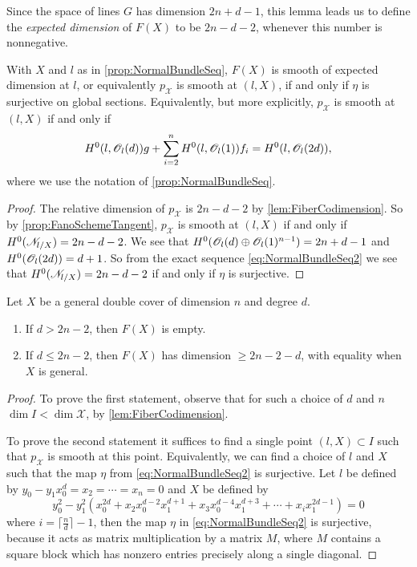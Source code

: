 Since the space of lines $G$ has dimension $2n+d-1$, this lemma leads us to define the \emph{expected dimension} of $F(X)$ to be $2n-d-2$, whenever this number is nonnegative.

\begin{proposition}
\label{prop:LocalSmoothConditionDoubleCover}
  With $X$ and $l$ as in \cref{prop:NormalBundleSeq}, $F(X)$ is smooth of expected dimension at $l$, or equivalently $p_{\mathscr{X}}$ is smooth at $(l,X)$, if and only if $\eta$ is surjective on global sections. Equivalently, but more explicitly, $p_{\mathscr{X}}$ is smooth at $(l,X)$ if and only if
\[ H^0(l,\mathscr{O}_l(d))g + \sum_{i=2}^nH^0(l,\mathscr{O}_l(1))f_i = H^0(l,\mathscr{O}_l(2d)),\]
where we use the notation of \cref{prop:NormalBundleSeq}.
\end{proposition}
\begin{proof}
The relative dimension of $p_{\mathscr{X}}$ is $2n-d-2$ by \cref{lem:FiberCodimension}. So by \cref{prop:FanoSchemeTangent}, $p_{\mathscr{X}}$ is smooth at $(l,X)$ if and only if $H^0(\mathscr{N}_{l/X}) = 2n-d-2$. We see that $H^0(\mathscr{O}_l(d) \oplus \mathscr{O}_l(1)^{n-1}) = 2n+d-1$ and $H^0(\mathscr{O}_l(2d)) = d+1$. So from the exact sequence \eqref{eq:NormalBundleSeq2} we see that $H^0(\mathscr{N}_{l/X}) = 2n-d-2$ if and only if $\eta$ is surjective.
\end{proof}

\begin{proposition}
\label{prop:FanoVarietyExpectedDimension}
Let $X$ be a general double cover of dimension $n$ and degree $d$.
\begin{enumerate}
	\item If $d > 2n-2$, then $F(X)$ is empty.
	\item If $d \leq 2n-2$, then $F(X)$ has dimension $ \geq 2n-2-d$, with equality when $X$ is general.
\end{enumerate}
  
\end{proposition}
\begin{proof}
To prove the first statement, observe that for such a choice of $d$ and $n$ $\dim I < \dim \mathscr{X}$, by \cref{lem:FiberCodimension}.

  To prove the second statement it suffices to find a single point $(l,X) \subset I$ such that $p_{\mathscr{X}}$ is smooth at this point. Equivalently, we can find a choice of $l$ and $X$ such that the map $\eta$ from \eqref{eq:NormalBundleSeq2} is surjective. Let $l$ be defined by $y_0 - y_1x_0^d = x_2 = \cdots = x_n = 0$ and $X$ be defined by 
\[ y_0^2 - y_1^2(x_0^{2d} + x_2x_0^{d-2}x_1^{d+1} + x_3x_0^{d-4}x_1^{d+3} + \cdots + x_{i}x_1^{2d-1}) = 0 \]
where $i = \lceil \frac{n}{d} \rceil -1$, then the map $\eta$ in \eqref{eq:NormalBundleSeq2} is surjective, because it acts as matrix multiplication by a matrix $M$, where $M$ contains a square block which has nonzero entries precisely along a single diagonal.
\end{proof}

